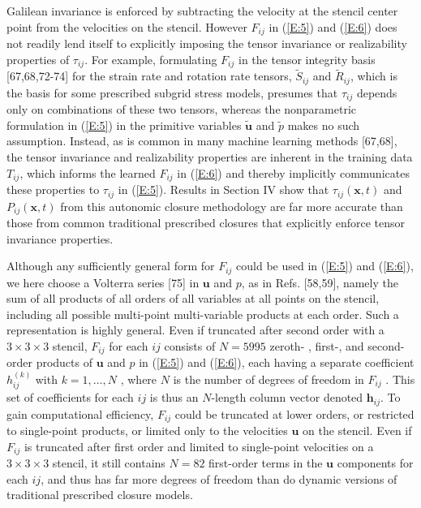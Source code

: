 Galilean invariance is enforced by subtracting the velocity at the stencil center point from the velocities on the stencil. However $F_{ij}$  in (\ref{E:5}) and (\ref{E:6}) does not readily lend itself to explicitly imposing the tensor invariance or realizability properties of  $\tau_{ij}$. For example, formulating  $F_{ij}$ in the tensor integrity basis [67,68,72-74] for the strain rate and rotation rate tensors, $\widetilde{S}_{ij}$  and $\widetilde{R}_{ij}$, which is the basis for some prescribed subgrid stress models, presumes that $\tau_{ij}$  depends only on combinations of these two tensors, whereas the nonparametric formulation in (\ref{E:5}) in the primitive variables   $\widetilde{\mathbf{u}}$  and  ${\widetilde{p}}$   makes no such assumption. Instead, as is common in many machine learning methods [67,68], the tensor invariance and realizability properties are inherent in the training data $T_{ij}$, which informs the learned $F_{ij}$  in (\ref{E:6}) and thereby implicitly communicates these properties to $\tau_{ij}$  in (\ref{E:5}). Results in Section IV show that $\tau_{ij}(\mathbf{x},t)$  and $P_{ij}(\mathbf{x},t)$   from this autonomic closure methodology are far more accurate than those from common traditional prescribed closures that explicitly enforce tensor invariance properties.

Although any sufficiently general form for  $F_{ij}$ could be used in (\ref{E:5}) and (\ref{E:6}), we here choose a Volterra series [75] in $\mathbf{u}$  and  $p$, as in Refs. [58,59], namely the sum of all products of all orders of all variables at all points on the stencil, including all possible multi-point multi-variable products at each order. Such a representation is highly general. Even if truncated after second order with a $3\times3\times3$  stencil,  $F_{ij}$ for each $ij$ consists of $N = 5995$ zeroth- , first-, and second-order products of $\mathbf{u}$  and  $p$ in (\ref{E:5}) and (\ref{E:6}), each having a separate coefficient  ${h_{ij}^{(k)}}$ with $k = {1,\ldots,N}$  , where $N$ is the number of degrees of freedom in $F_{ij}$ . This set of coefficients for each $ij$ is thus an $N$-length column vector denoted $\mathbf{h}_{ij}$. To gain computational efficiency, $F_{ij}$  could be truncated at lower orders, or restricted to single-point products, or limited only to the velocities $\mathbf{u}$ on the stencil. Even if $F_{ij}$  is truncated after first order and limited to single-point velocities on a  $3\times3\times3$  stencil, it still contains $N=82$ first-order terms in the $\mathbf{u}$ components for each $ij$, and thus has far more degrees of freedom than do dynamic versions of traditional prescribed closure models.  

